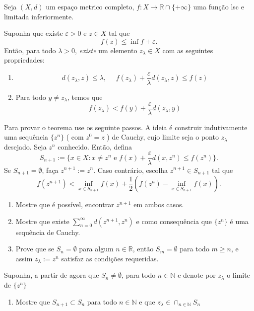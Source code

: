 \documentclass[a4paper,latin]{article}
\begin{document}
\begin{enumerate}
    Seja $(X,d)$ um espaço metrico completo,
    $f: X \rightarrow \mathbb{R}\cap \{+\infty\}$ uma 
    função lsc e limitada inferiormente. 
    
    Suponha que existe $\varepsilon>0$ 
    e $z \in X$ tal que 
    $$   f(z) \leq \inf f +  \varepsilon.$$
    Então, para todo $\lambda>0$, {\it existe} um elemento $z_{\lambda} \in X$
    com as seguintes propriedades:
       \begin{enumerate}
       \item 
       $$d(z_{\lambda}, z)\leq \lambda, \  \ \ \  \ \
       f(z_{\lambda})+
       \frac{\varepsilon}{\lambda}d(z_{\lambda}, z)\leq f(z)
       $$
       \item Para todo $y \neq z_{\lambda}$, 
       temos que 
        $$f(z_{\lambda})<
       f(y)+\frac{\varepsilon}{\lambda}d(z_{\lambda},y)$$
       \end{enumerate}
    Para provar o teorema use os seguinte passos.
    A ideia é construir indutivamente uma sequência $\{z^{n}\}$ 
    ( com $z^0=z$ )
    de Cauchy, cujo limite seja o ponto $z_{\lambda}$ desejado. 
    Seja $z^n$ conhecido. Então, defina 
       $$S_{n+1}:=\{x \in X: x \neq z^n \text{ e } f(x)+
       \frac{\varepsilon}{\lambda}d(x, z^n)\leq f(z^n)\}.$$
       Se $S_{n+1}=\emptyset$, faça $z^{n+1}:=z^n$. 
       Caso contrário, escolha 
       $z^{n+1} \in S_{n+1}$ tal que 
              $$
              f(z^{n+1})< \inf_{x \in S_{n+1}}f(x)+
              \frac{1}{2}(f(z^n)-\inf_{x \in S_{n+1}}f(x)).$$
       \begin{enumerate}
       \item Mostre que é possível, encontrar $z^{n+1}$ em ambos casos.        
       \item Mostre que existe 
       $\sum_{n=0}^{\infty} d(z^{n+1}, z^n)$ e como consequência que
       $\{z^n\}$ é uma sequência de Cauchy.
       \item Prove que se $S_{n}=\emptyset$ para algum 
       $n \in \mathbb{R}$, então $S_{m}=\emptyset$ para todo $m \geq n$, e assim $z_{\lambda}:=z^{n}$ satisfaz as condições requeridas.
       \end{enumerate}   
        Suponha, a partir de agora que $S_{n}\neq \emptyset$, para todo
        $n \in \mathbb{N}$ e denote por $z_{\lambda}$ o limite de 
        $\{z^{n}\}$
          \begin{enumerate}
          \item Mostre que $S_{n+1}\subset S_{n}$ para todo 
          $n \in \mathbb{N}$ e que $z_{\lambda} \in 
           \cap_{n \in \mathbb{N}} S_{n}$ 

\end{enumerate}
\end{enumerate}
\end{document}
